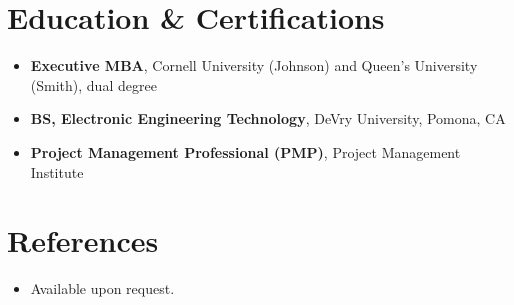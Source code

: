 \documentclass[11pt,letterpaper,sans]{moderncv}
\begin{document}

\section{Education \& Certifications}
\vspace{1pt}
\begin{itemize}
\item{\textbf{Executive MBA}, Cornell University (Johnson) and Queen's University (Smith), dual degree}
\item{\textbf{BS, Electronic Engineering Technology}, DeVry University, Pomona, CA}
\item{\textbf{Project Management Professional (PMP)}, Project Management Institute}
\end{itemize}


\section{References}
\vspace{1pt}
\begin{itemize}
\item{Available upon request.}
\end{itemize}
\end{document}
